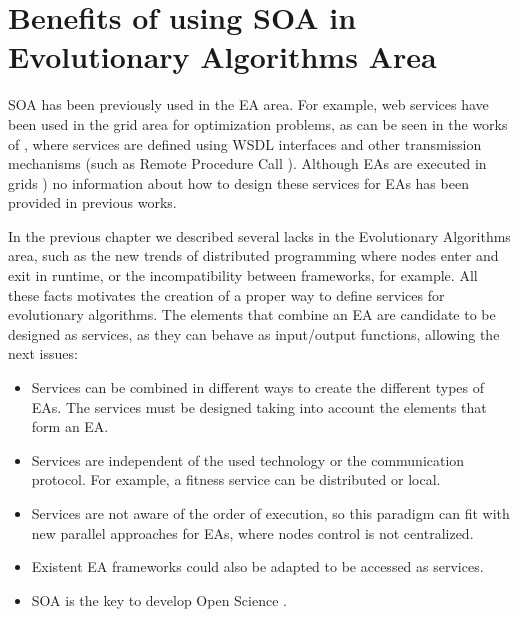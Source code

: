 \section{Benefits of using SOA in Evolutionary Algorithms Area}

\lettrine{S}{OA} has been previously used in the EA area. For example,
web services have been used in the grid area for optimization
problems, as can be seen in the works of
\cite{grid1,grid2,grid3,grid5}, where services are defined using WSDL
interfaces and other transmission mechanisms (such as Remote Procedure
Call \citep{grid6,grid7}). Although EAs are executed in grids
\citep{grid8,grid4,grid10}) no information about how to design these
services for EAs has been provided in previous works.  %

In the previous chapter we described several lacks %
 in the Evolutionary Algorithms area, such as the new trends of
 distributed programming where nodes enter and exit in runtime, or the
 incompatibility between frameworks, for example. All these facts
 motivates the creation of a proper way to define services for evolutionary algorithms. The elements that combine an EA are candidate to be designed as services, as they can behave as input/output functions, allowing the next issues:  

\begin{itemize}
\item Services can be combined in different ways to create the different types of EAs. The services must be designed taking into account the elements that form an EA. 
\item Services are independent of the used technology or the
  communication protocol. For example, a fitness service can be
  distributed or local. %
\item Services are not aware of the order of execution, so this paradigm can fit with new parallel approaches for EAs, where nodes control is not centralized. 
\item Existent EA frameworks could also be adapted to be accessed as services.
\item SOA is the key to develop Open Science
  \cite{Foster2005Science}.%
\end{itemize}


